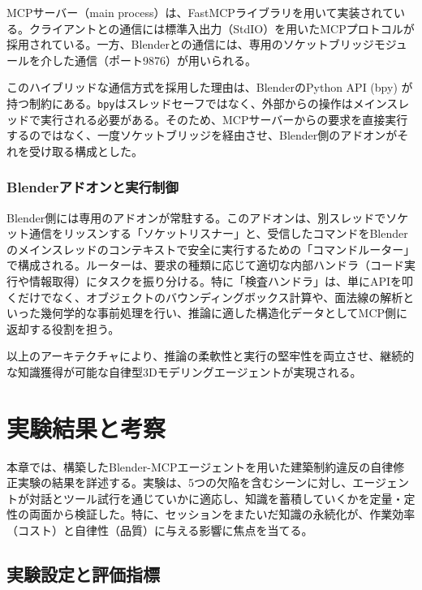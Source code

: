 \documentclass[dvipdfmx, a4paper, 9pt]{deimj}
\begin{document}
MCPサーバー（main process）は、FastMCPライブラリを用いて実装されている。クライアントとの通信には標準入出力（StdIO）を用いたMCPプロトコルが採用されている。一方、Blenderとの通信には、専用のソケットブリッジモジュールを介した通信（ポート9876）が用いられる。

このハイブリッドな通信方式を採用した理由は、BlenderのPython API (bpy) が持つ制約にある。\texttt{bpy}はスレッドセーフではなく、外部からの操作はメインスレッドで実行される必要がある。そのため、MCPサーバーからの要求を直接実行するのではなく、一度ソケットブリッジを経由させ、Blender側のアドオンがそれを受け取る構成とした。

\subsubsection{Blenderアドオンと実行制御}

Blender側には専用のアドオンが常駐する。このアドオンは、別スレッドでソケット通信をリッスンする「ソケットリスナー」と、受信したコマンドをBlenderのメインスレッドのコンテキストで安全に実行するための「コマンドルーター」で構成される。ルーターは、要求の種類に応じて適切な内部ハンドラ（コード実行や情報取得）にタスクを振り分ける。特に「検査ハンドラ」は、単にAPIを叩くだけでなく、オブジェクトのバウンディングボックス計算や、面法線の解析といった幾何学的な事前処理を行い、推論に適した構造化データとしてMCP側に返却する役割を担う。

以上のアーキテクチャにより、推論の柔軟性と実行の堅牢性を両立させ、継続的な知識獲得が可能な自律型3Dモデリングエージェントが実現される。

\section{実験結果と考察}

本章では、構築したBlender-MCPエージェントを用いた建築制約違反の自律修正実験の結果を詳述する。実験は、5つの欠陥を含むシーンに対し、エージェントが対話とツール試行を通じていかに適応し、知識を蓄積していくかを定量・定性の両面から検証した。特に、セッションをまたいだ知識の永続化が、作業効率（コスト）と自律性（品質）に与える影響に焦点を当てる。

\subsection{実験設定と評価指標}
\end{document}
